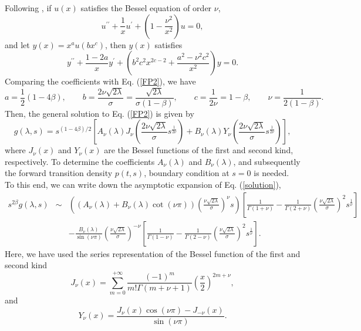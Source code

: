 \documentclass[12pt]{article}
\begin{document}
  Following \cite{Bessel}, if $u(x)$ satisfies the Bessel equation of order $\nu$,
  \begin{equation}
    u^{\prime\prime}+\frac{1}{x}u^{\prime}+\left(1-\frac{\nu^2}{x^2}\right)u=0,
  \end{equation}
  and let $y(x)=x^au(bx^c)$, then $y(x)$ satisfies
  \begin{equation}
    y^{\prime\prime}+\frac{1-2a}{x}y^{\prime}+\left(b^2c^2x^{2c-2}+\frac{a^2-\nu^2c^2}{x^2}\right)y=0.
  \end{equation}
  Comparing the coefficients with Eq. (\ref{FP2}), we have
  \begin{equation}
    a=\frac{1}{2}\left(1-4\beta\right),\quad\quad
    b=\frac{2\nu\sqrt{2\lambda}}{\sigma}=\frac{\sqrt{2\lambda}}{\sigma(1-\beta)},\quad\quad
    c=\frac{1}{2\nu}=1-\beta,\quad\quad
    \nu=\frac{1}{2(1-\beta)}.
  \end{equation}
  Then, the general solution to Eq. (\ref{FP2}) is given by
  \begin{equation}
    g(\lambda, s)=s^{(1-4\beta)/2}\left[A_{\nu}(\lambda)J_{\nu}\left(\frac{2\nu\sqrt{2\lambda}}{\sigma}s^{\frac{1}{2\nu}}\right)
                                       +B_{\nu}(\lambda)Y_{\nu}\left(\frac{2\nu\sqrt{2\lambda}}{\sigma}s^{\frac{1}{2\nu}}\right)\right],
    \label{solution}
  \end{equation}
  where $J_{\nu}(x)$ and $Y_{\nu}(x)$ are the Bessel functions of the first and second kind, respectively. To determine the
  coefficients $A_{\nu}(\lambda)$ and $B_{\nu}(\lambda)$, and subsequently the forward transition density $p(t,s)$, boundary condition
  at $s=0$ is needed. To this end, we can write down the asymptotic expansion of Eq. (\ref{solution}),
  \begin{eqnarray}
    s^{2\beta}g(\lambda,s)&\sim& \left(\left(A_{\nu}(\lambda)+B_{\nu}(\lambda)\cot(\nu\pi)\right)
                  \left(\frac{\nu\sqrt{2\lambda}}{\sigma}\right)^{\nu}s\right)\left[\frac{1}{\Gamma(1+\nu)}
              -\frac{1}{\Gamma(2+\nu)}\left(\frac{\nu\sqrt{2\lambda}}{\sigma}\right)^{2}s^{\frac{1}{\nu}}\right]\nonumber\\
              &&-\frac{B_{\nu}(\lambda)}{\sin(\nu\pi)}\left(\frac{\nu\sqrt{2\lambda}}{\sigma}\right)^{-\nu}
              \left[\frac{1}{\Gamma(1-\nu)}
              -\frac{1}{\Gamma(2-\nu)}\left(\frac{\nu\sqrt{2\lambda}}{\sigma}\right)^{2}s^{\frac{1}{\nu}}\right].
  \end{eqnarray}
  Here, we have used the series representation of the Bessel function of the first and second kind
  \begin{equation}
    J_{\nu}(x)=\sum_{m=0}^{+\infty}\frac{(-1)^m}{m!\Gamma(m+\nu+1)}\left(\frac{x}{2}\right)^{2m+\nu},
  \end{equation}
  and
  \begin{equation}
    Y_{\nu}(x)=\frac{J_{\nu}(x)\cos(\nu\pi)-J_{-\nu}(x)}{\sin(\nu\pi)}.
  \end{equation}
\end{document}
